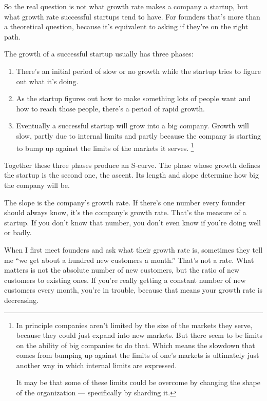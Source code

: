 So the real question is not what growth rate makes a company a startup,
but what growth rate successful startups tend to have. For founders
that's more than a theoretical question, because it's equivalent to
asking if they're on the right path.

The growth of a successful startup usually has three phases:

\begin{enumerate}
\def\labelenumi{\arabic{enumi}.}
\item
  There's an initial period of slow or no growth while the startup tries
  to figure out what it's doing.
\item
  As the startup figures out how to make something lots of people want
  and how to reach those people, there's a period of rapid growth.
\item
  Eventually a successful startup will grow into a big company. Growth
  will slow, partly due to internal limits and partly because the
  company is starting to bump up against the limits of the markets it
  serves. \footnote{In principle companies aren't limited by the size of the markets
they serve, because they could just expand into new markets. But there
seem to be limits on the ability of big companies to do that. Which
means the slowdown that comes from bumping up against the limits of
one's markets is ultimately just another way in which internal limits
are expressed.

It may be that some of these limits could be overcome by changing the
shape of the organization --- specifically by sharding it.}
\end{enumerate}

Together these three phases produce an S-curve. The phase whose growth
defines the startup is the second one, the ascent. Its length and slope
determine how big the company will be.

The slope is the company's growth rate. If there's one number every
founder should always know, it's the company's growth rate. That's the
measure of a startup. If you don't know that number, you don't even know
if you're doing well or badly.

When I first meet founders and ask what their growth rate is, sometimes
they tell me ``we get about a hundred new customers a month.'' That's
not a rate. What matters is not the absolute number of new customers,
but the ratio of new customers to existing ones. If you're really
getting a constant number of new customers every month, you're in
trouble, because that means your growth rate is decreasing.


